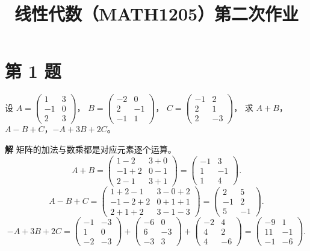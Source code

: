 \documentclass[11pt,a4paper]{ctexart}
\title{线性代数（MATH1205）第二次作业}
\author{}
\date{}
\newenvironment{problem}[1]
  {\par\medskip\noindent\textbf{#1}\quad}
  {\par}
\newenvironment{solution}
  {\par\noindent\textbf{解}\quad}
  {\par}
\begin{document}
\maketitle
\vspace{-3em}

\section*{第 1 题}

\begin{problem}{}设
$A=\begin{pmatrix}1&3\\-1&0\\2&3\end{pmatrix}$，
$B=\begin{pmatrix}-2&0\\2&-1\\-1&1\end{pmatrix}$，
$C=\begin{pmatrix}-1&2\\2&1\\2&-3\end{pmatrix}$，
求 $A+B$，$A-B+C$，$-A+3B+2C$。
\end{problem}

\begin{solution}
矩阵的加法与数乘都是对应元素逐个运算。
\[
A+B=\begin{pmatrix}1-2&3+0\\-1+2&0-1\\2-1&3+1\end{pmatrix}
=\begin{pmatrix}-1&3\\1&-1\\1&4\end{pmatrix}.
\]
\[
A-B+C=\begin{pmatrix}1+2-1&3-0+2\\-1-2+2&0+1+1\\2+1+2&3-1-3\end{pmatrix}
=\begin{pmatrix}2&5\\-1&2\\5&-1\end{pmatrix}.
\]
\[
-A+3B+2C
=\begin{pmatrix}-1&-3\\1&0\\-2&-3\end{pmatrix}
+\begin{pmatrix}-6&0\\6&-3\\-3&3\end{pmatrix}
+\begin{pmatrix}-2&4\\4&2\\4&-6\end{pmatrix}
=\begin{pmatrix}-9&1\\11&-1\\-1&-6\end{pmatrix}.
\]
\end{solution}
\end{document}

